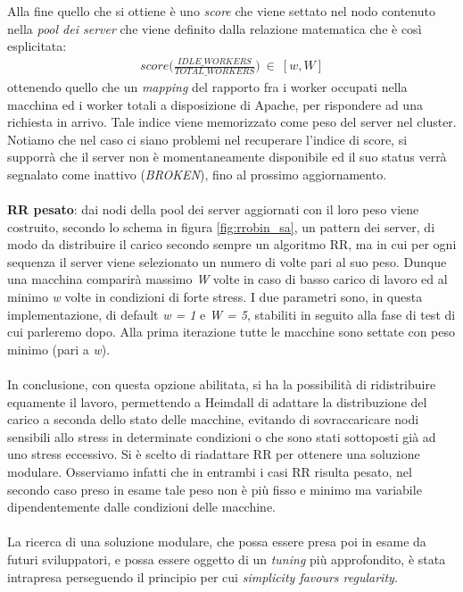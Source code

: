 \documentclass[italian]{tktltiki2}
\begin{document}
Alla fine quello che si ottiene è uno \emph{score} che viene settato nel nodo contenuto nella \emph{pool dei server} che viene definito dalla relazione matematica che è così esplicitata:
\begin{align*}
  score\Big(\frac{IDLE\_WORKERS}{TOTAL\_WORKERS}\Big) ~ \in ~ [w, W]
\end{align*}
ottenendo quello che un \emph{mapping} del rapporto fra i worker occupati nella macchina ed i worker totali a disposizione di Apache, per rispondere ad una richiesta in arrivo. Tale indice viene memorizzato come peso del server nel cluster.
\\
Notiamo che nel caso ci siano problemi nel recuperare l'indice di score, si supporrà che il server non è momentaneamente disponibile ed il suo status verrà segnalato come inattivo (\emph{BROKEN}), fino al prossimo aggiornamento.
\\\\
\textbf{RR pesato}: dai nodi della pool dei server aggiornati con il loro peso viene costruito, secondo lo schema in figura \ref{fig:rrobin_sa}, un pattern dei server, di modo da distribuire il carico secondo sempre un algoritmo RR, ma in cui per ogni sequenza il server viene selezionato un numero di volte pari al suo peso. Dunque una macchina comparirà massimo \emph{W} volte in caso di basso carico di lavoro ed al minimo \emph{w} volte in condizioni di forte stress. I due parametri sono, in questa implementazione, di default \emph{w = 1} e \emph{W = 5}, stabiliti in seguito alla fase di test di cui parleremo dopo. Alla prima iterazione tutte le macchine sono settate con peso minimo (pari a \emph{w}).
\\\\
In conclusione, con questa opzione abilitata, si ha la possibilità di ridistribuire equamente il lavoro, permettendo a Heimdall di adattare la distribuzione del carico a seconda dello stato delle macchine, evitando di sovraccaricare nodi sensibili allo stress in determinate condizioni o che sono stati sottoposti già ad uno stress eccessivo. Si è scelto di riadattare RR per ottenere una soluzione modulare. Osserviamo infatti che in entrambi i casi RR risulta pesato, nel secondo caso preso in esame tale peso non è più fisso e minimo ma variabile dipendentemente dalle condizioni delle macchine.\\\\
La ricerca di una soluzione modulare, che possa essere presa poi in esame da futuri sviluppatori, e possa essere oggetto di un \emph{tuning} più approfondito, è stata intrapresa perseguendo il principio per cui \emph{simplicity favours regularity}.
\end{document}
